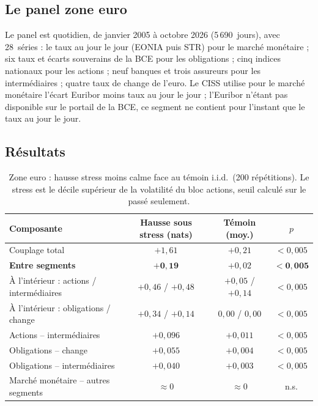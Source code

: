 \documentclass[11pt]{article}
\theoremstyle{definition}
\begin{document}
\subsection{Le panel zone euro}

Le panel est quotidien, de janvier 2005 à octobre 2026 (5\,690~jours), avec
28~séries : le taux au jour le jour (EONIA puis \texteuro{}STR) pour le marché
monétaire ; six taux et écarts souverains de la BCE pour les obligations ; cinq
indices nationaux pour les actions ; neuf banques et trois assureurs pour les
intermédiaires ; quatre taux de change de l'euro. Le CISS utilise pour le
marché monétaire l'écart Euribor moins taux au jour le jour ; l'Euribor
n'étant pas disponible sur le portail de la BCE, ce segment ne contient pour
l'instant que le taux au jour le jour.

\subsection{Résultats}

\begin{table}[htbp]
\centering
\small
\begin{tabular}{@{}lccc@{}}
\toprule
Composante & Hausse sous stress (nats) & Témoin (moy.) & $p$ \\
\midrule
Couplage total & $+1{,}61$ & $+0{,}21$ & $<0{,}005$ \\
\textbf{Entre segments} & $\mathbf{+0{,}19}$ & $+0{,}02$ & $\mathbf{<0{,}005}$ \\
À l'intérieur : actions / intermédiaires & $+0{,}46$ / $+0{,}48$ & $+0{,}05$ / $+0{,}14$ & $<0{,}005$ \\
À l'intérieur : obligations / change & $+0{,}34$ / $+0{,}14$ & $0{,}00$ / $0{,}00$ & $<0{,}005$ \\
Actions -- intermédiaires & $+0{,}096$ & $+0{,}011$ & $<0{,}005$ \\
Obligations -- change & $+0{,}055$ & $+0{,}004$ & $<0{,}005$ \\
Obligations -- intermédiaires & $+0{,}040$ & $+0{,}003$ & $<0{,}005$ \\
Marché monétaire -- autres segments & $\approx 0$ & $\approx 0$ & n.s. \\
\bottomrule
\end{tabular}
\caption{Zone euro : hausse stress moins calme face au témoin i.i.d.\ (200
répétitions). Le stress est le décile supérieur de la volatilité du bloc
actions, seuil calculé sur le passé seulement.}
\label{tab:cb-euro}
\end{table}
\end{document}
